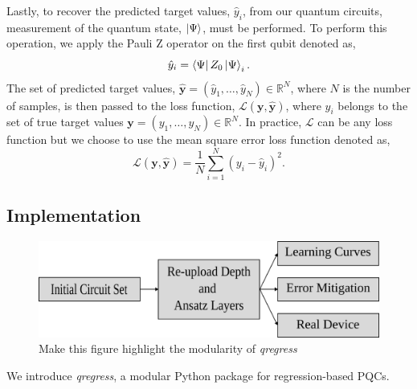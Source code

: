 \documentclass[journal=jacsat,manuscript=article]{achemso}
\begin{document}
Lastly, to recover the predicted target values, $\hat{y}_{i}$, from our quantum circuits, measurement of the quantum state, $\ket{\Psi}$, must be performed.
To perform this operation, we apply the Pauli Z operator on the first qubit denoted as,
\begin{equation}
	\hat{y}_{i} = \bra{\Psi}Z_{0}\ket{\Psi}_{i}.
	\label{eq:y_pred}
\end{equation}
The set of predicted target values, $\bm{\hat{y}} = (\hat{y}_{1}, \ldots, \hat{y}_{N}) \in \mathbb{R}^{N}$, where $N$ is the number of samples, is then passed to the loss function, $\mathcal{L}(\bm{y}, \bm{\hat y})$, where $y_{i}$ belongs to the set of true target values $\bm{y} = (y_{1}, \ldots, y_{N}) \in \mathbb{R}^{N}$.
In practice, $\mathcal{L}$ can be any loss function but we choose to use the mean square error loss function denoted as,
\begin{equation}
	\mathcal{L}(\bm{y}, \bm{\hat y}) = \frac{1}{N} \sum_{i=1}^{N} (y_{i} - \hat{y}_{i})^{2}.
	\label{eq:isthisloss}
\end{equation}


\subsection{Implementation}
\begin{figure}[H]
	\centering
	\includegraphics[width=\linewidth]{../images/manuscript_figures/overview.png}
	\caption{Make this figure highlight the modularity of \textit{qregress}}
	\label{fig:overview_project}
\end{figure}

We introduce \textit{qregress}, a modular Python package for regression-based PQCs.
\end{document}
